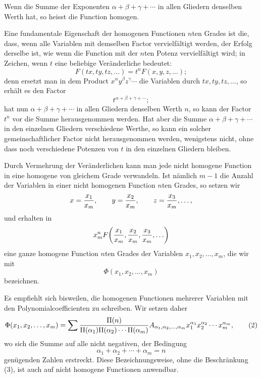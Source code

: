 \documentclass[11pt]{article}
\begin{document}
Wenn die Summe der Exponenten $\alpha+\beta+\gamma+\cdots$ in allen Gliedern denselben Werth hat, so heisst die Function homogen.

Eine fundamentale Eigenschaft der homogenen Functionen $n$ten Grades ist die, dass, wenn alle Variablen mit demselben Factor vervielfältigt werden, der Erfolg derselbe ist, wie wenn die Function mit der $n$ten Potenz vervielfältigt wird; in Zeichen, wenn $t$ eine beliebige Veränderliche bedeutet:
\begin{equation}
 F(tx,ty,tz,\ldots)=t^nF(x,y,z,\ldots);
\tag{1}
\end{equation}
denn ersetzt man in dem Product $x^\alpha y^\beta z^\gamma\cdots$ die Variablen durch $tx,ty,tz,\ldots$, so erhält es den Factor
\[
 t^{\alpha+\beta+\gamma+\cdots};
\]
hat nun $\alpha+\beta+\gamma+\cdots$ in allen Gliedern denselben Werth $n$, so kann der Factor $t^n$ vor die Summe herausgenommen werden. Hat aber die Summe $\alpha+\beta+\gamma+\cdots$ in den einzelnen Gliedern verschiedene Werthe, so kann ein solcher gemeinschaftlicher Factor nicht herausgenommen werden, wenigstens nicht, ohne dass noch verschiedene Potenzen von $t$ in den einzelnen Gliedern bleiben.

Durch Vermehrung der Veränderlichen kann man jede nicht homogene Function in eine homogene von gleichem Grade verwandeln. Ist nämlich $m-1$ die Anzahl der Variablen in einer nicht homogenen Function $n$ten Grades, so setzen wir
\[
 x={x_1\over x_m},\qquad y={x_2\over x_m},\qquad z={x_3\over x_m},\ldots,
\]
und erhalten in
\[
 x_m^n F\!\left({x_1\over x_m},{x_2\over x_m},{x_3\over x_m},\ldots\right)
\]
eine ganze homogene Function $n$ten Grades der Variablen $x_1,x_2,\ldots,x_m$, die wir mit
\[
 \Phi(x_1,x_2,\ldots,x_m)
\]
bezeichnen.

Es empfiehlt sich bisweilen, die homogenen Functionen mehrerer Variablen mit den Polynomialcoefficienten zu schreiben. Wir setzen daher
\begin{equation}
 \Phi(x_1,x_2,\ldots,x_m)=
 \sum{\Pi(n)\over\Pi(\alpha_1)\Pi(\alpha_2)\cdots\Pi(\alpha_m)}
 A_{\alpha_1,\alpha_2,\ldots,\alpha_m}
 x_1^{\alpha_1}x_2^{\alpha_2}\cdots x_m^{\alpha_m},
\tag{2}
\end{equation}
wo sich die Summe auf alle nicht negativen, der Bedingung
\begin{equation}
 \alpha_1+\alpha_2+\cdots+\alpha_m=n
\tag{3}
\end{equation}
genügenden Zahlen erstreckt. Diese Bezeichnungsweise, ohne die Beschränkung (3), ist auch auf nicht homogene Functionen anwendbar.
\end{document}
